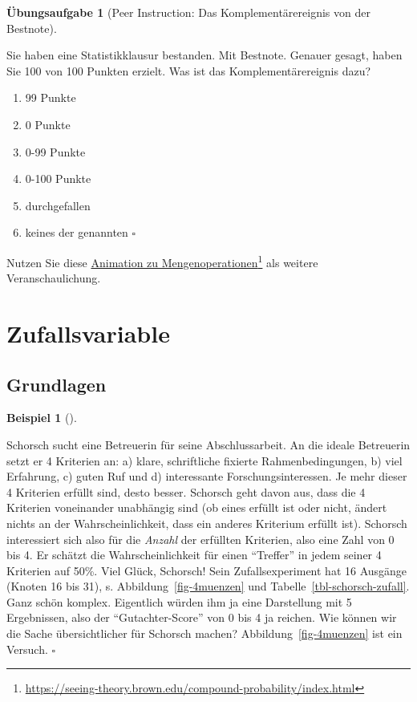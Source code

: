 \documentclass[
  ngerman,
  letterpaper,
  twoside,
  open=any]{scrbook}
\providecommand{\tightlist}{%
  \setlength{\itemsep}{0pt}\setlength{\parskip}{0pt}}\usepackage{longtable,booktabs,array}
\theoremstyle{definition}
\newtheorem{example}{Beispiel}[chapter]
\theoremstyle{plain}
\theoremstyle{definition}
\newtheorem{exercise}{Übungsaufgabe}[chapter]
\theoremstyle{definition}
\theoremstyle{remark}
\begin{document}
\begin{exercise}[Peer Instruction: Das Komplementärereignis von der
Bestnote]\protect\hypertarget{exr-komplement}{}\label{exr-komplement}

Sie haben eine Statistikklausur bestanden. Mit Bestnote. Genauer gesagt,
haben Sie 100 von 100 Punkten erzielt. Was ist das Komplementärereignis
dazu?

\begin{enumerate}
\def\labelenumi{\Alph{enumi})}
\tightlist
\item
  99 Punkte
\item
  0 Punkte
\item
  0-99 Punkte
\item
  0-100 Punkte
\item
  durchgefallen
\item
  keines der genannten \(\square\)
\end{enumerate}

\end{exercise}

Nutzen Sie diese
\href{https://seeing-theory.brown.edu/compound-probability/index.html}{Animation
zu Mengenoperationen}\footnote{\url{https://seeing-theory.brown.edu/compound-probability/index.html}}
als weitere Veranschaulichung.

\section{Zufallsvariable}\label{zufallsvariable}

\subsection{Grundlagen}\label{grundlagen-1}

\begin{example}[]\protect\hypertarget{exm-thesis}{}\label{exm-thesis}

Schorsch sucht eine Betreuerin für seine Abschlussarbeit. An die ideale
Betreuerin setzt er 4 Kriterien an: a) klare, schriftliche fixierte
Rahmenbedingungen, b) viel Erfahrung, c) guten Ruf und d) interessante
Forschungsinteressen. Je mehr dieser 4 Kriterien erfüllt sind, desto
besser. Schorsch geht davon aus, dass die 4 Kriterien voneinander
unabhängig sind (ob eines erfüllt ist oder nicht, ändert nichts an der
Wahrscheinlichkeit, dass ein anderes Kriterium erfüllt ist). Schorsch
interessiert sich also für die \emph{Anzahl} der erfüllten Kriterien,
also eine Zahl von 0 bis 4. Er schätzt die Wahrscheinlichkeit für einen
\enquote{Treffer} in jedem seiner 4 Kriterien auf 50\%. Viel Glück,
Schorsch! Sein Zufallsexperiment hat 16 Ausgänge (Knoten 16 bis 31), s.
Abbildung~\ref{fig-4muenzen} und Tabelle~\ref{tbl-schorsch-zufall}. Ganz
schön komplex. Eigentlich würden ihm ja eine Darstellung mit 5
Ergebnissen, also der \enquote{Gutachter-Score} von 0 bis 4 ja reichen.
Wie können wir die Sache übersichtlicher für Schorsch machen?
Abbildung~\ref{fig-4muenzen} ist ein Versuch. \(\square\)

\end{example}
\end{document}
